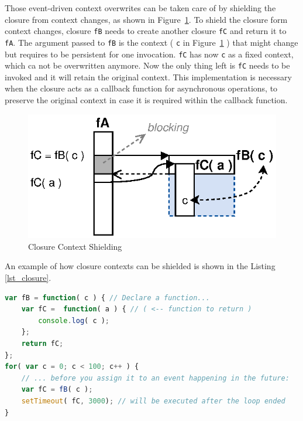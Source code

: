 Those event-driven context overwrites can be taken care of by shielding the closure from context changes, as shown in Figure~\ref{fig:Closures_Closure-3}.
To shield the closure form context changes, closure \texttt{fB} needs to create another closure \texttt{fC} and return it to \texttt{fA}.
The argument passed to \texttt{fB} is the context ( \texttt{c} in Figure~\ref{fig:Closures_Closure-3} ) that might change but requires to be persistent for one invocation.
\texttt{fC} has now \texttt{c} as a fixed context, which ca not be overwritten anymore.
Now the only thing left is \texttt{fC} needs to be invoked and it will retain the original context.
This implementation is necessary when the closure acts as a callback function for asynchronous operations, to preserve the original context in case it is required within the callback function.
\begin{figure}[!ht]
	\centering
  \includegraphics{figures/Closures_Closure-3}
	\caption{Closure Context Shielding}
	\label{fig:Closures_Closure-3}
\end{figure}

An example of how closure contexts can be shielded is shown in the Listing \ref{lst_closure}.
\begin{lstlisting}[float=h,label=lst_closure,language=JavaScript,caption=JavaScript Closure Context Shielding]
var fB = function( c ) { // Declare a function...
	var fC =  function( a ) { // ( <-- function to return )
		console.log( c );
	};
	return fC;
};
for( var c = 0; c < 100; c++ ) {
	// ... before you assign it to an event happening in the future:
	var fC = fB( c );
	setTimeout( fC, 3000); // will be executed after the loop ended
}
\end{lstlisting}


